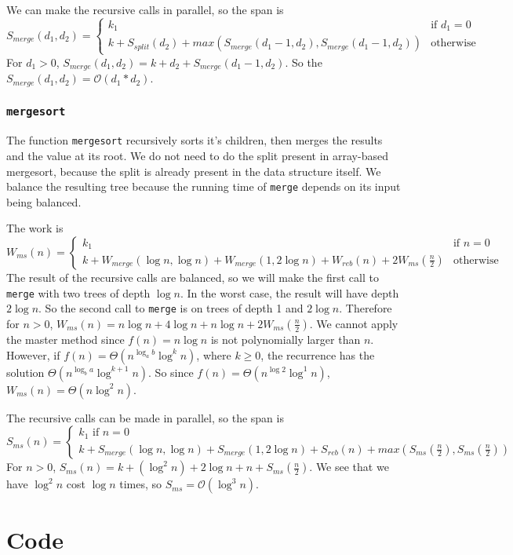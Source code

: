 \documentclass[12pt,letterpaper]{article}
\newcommand{\T}[1]{\texttt{#1}}
\begin{document}
We can make the recursive calls in parallel, so the span is
\[ S_{merge}(d_1, d_2) =
  \begin{cases}
    k_1 & \text{if } d_1=0\\
    k + S_{split}(d_2) + max(S_{merge}(d_1-1,d_2),S_{merge}(d_1-1,d_2)) & \text{otherwise}
  \end{cases}
\]
For $d_1>0$, $S_{merge}(d_1, d_2) = k + d_2 + S_{merge}(d_1-1,d_2)$.
So the $S_{merge}(d_1, d_2) = \mathcal{O}(d_1*d_2)$.


\subsubsection{\T{mergesort}}
The function \T{mergesort} recursively sorts it's children, then merges the results and the value at its root. We do not need to do the split present in array-based mergesort, because the split is already present in the data structure itself.
We balance the resulting tree because the running time of \T{merge} depends on its input being balanced.

The work is
\[ W_{ms}(n) = 
  \begin{cases}
    k_1 & \text{if } n=0\\
    k + W_{merge}(\log n, \log n) + W_{merge}(1, 2\log n) + W_{reb}(n) + 2W_{ms}(\frac{n}{2}) &\text{otherwise}
  \end{cases}
\]
The result of the recursive calls are balanced, so we will make the first call to \T{merge} with two trees of depth $\log n$.
In the worst case, the result will have depth $2\log n$.
So the second call to \T{merge} is on trees of depth 1 and $2\log n$.
Therefore for $n>0$, $W_{ms}(n) = n\log n + 4\log n + n\log n + 2W_{ms}(\frac{n}{2})$.
We cannot apply the master method since $f(n) = n\log n$ is not polynomially larger than $n$.
However, if $f(n) = \Theta(n^{\log_a b} \log^k n)$, where $k \geq 0$, the recurrence has the solution $\Theta(n^{\log_b a}\log^{k+1} n)$.
So since $f(n) = \Theta(n^{\log 2} \log^1 n)$, $W_{ms}(n) = \Theta(n\log^2n)$.


The recursive calls can be made in parallel, so the span is
\[ S_{ms}(n) = 
  \begin{cases}
    k_1 \text{  if } n=0\\
    k + S_{merge}(\log n, \log n) + S_{merge}(1, 2\log n) + S_{reb}(n) + max(S_{ms}(\frac{n}{2}), S_{ms}(\frac{n}{2}))
  \end{cases}
\]
For $n>0$, $S_{ms}(n) = k + (\log^2 n) + 2\log n + n + S_{ms}(\frac{n}{2})$.
We see that we have $\log^2 n$ cost $\log n$ times, so $S_{ms} = \mathcal{O}(\log^3 n)$.


\section{Code}

\end{document}
